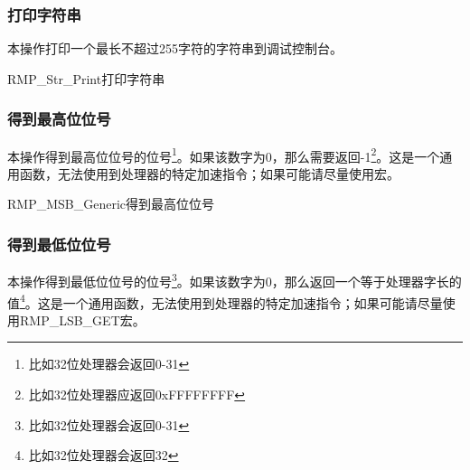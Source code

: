 \subsubsection{打印字符串}\label{subsubsec:print-a-string}

本操作打印一个最长不超过255字符的字符串到调试控制台。

\begin{apidesc}{RMP\_Str\_Print}{打印字符串}
    \begin{apiparams}
    \end{apiparams}
    \begin{apiret}
    \end{apiret}
\end{apidesc}

\subsubsection{得到最高位位号}\label{subsubsec:get-the-most-significant-bit-of-a-word}

本操作得到最高位位号的位号\footnote{比如32位处理器会返回0-31}。如果该数字为0，那么需要返回-1\footnote{比如32位处理器应返回0xFFFFFFFF}。这是一个通用函数，无法使用到处理器的特定加速指令；如果可能请尽量使用宏。

\begin{apidesc}{RMP\_MSB\_Generic}{得到最高位位号}
    \begin{apiparams}
    \end{apiparams}
    \begin{apiret}
    \end{apiret}
\end{apidesc}

\subsubsection{得到最低位位号}\label{subsubsec:get-the-least-significant-bit-of-a-word}

本操作得到最低位位号的位号\footnote{比如32位处理器会返回0-31}。如果该数字为0，那么返回一个等于处理器字长的值\footnote{比如32位处理器会返回32}。这是一个通用函数，无法使用到处理器的特定加速指令；如果可能请尽量使用RMP\_LSB\_GET宏。

